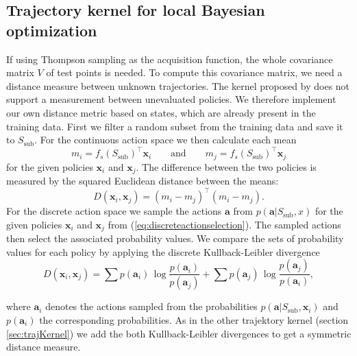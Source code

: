 \subsection{Trajectory kernel for local Bayesian optimization}
\label{sec:ownTK}
If using Thompson sampling as the acquisition function, the whole covariance matrix $V$ of test points is needed. To compute this covariance matrix, we need a distance measure between unknown trajectories. The kernel proposed by \cite{wilson2014using} does not support a measurement between unevaluated policies. We therefore implement our own distance metric based on states, which are already present in the training data. First we filter a random subset from the training data and save it to $S_{\text{sub}}$. For the continuous action space we then calculate each mean
$$m_i = f_s(S_{\text{sub}})^\top \mathbf{x}_i \qquad \text{and}\qquad m_j = f_s(S_{\text{sub}})^\top \mathbf{x}_j$$
for the given policies $\mathbf{x}_i$ and $\mathbf{x}_j$. The difference between the two policies is measured by the squared Euclidean distance between the means:
$$D(\mathbf{x}_i,\mathbf{x}_j) = (m_i - m_j)^\top (m_i - m_j).$$
For the discrete action space we sample the actions $\mathbf{a}$ from $p(\mathbf{a}|S_{\text{sub}},x)$ for the given policies $\mathbf{x}_i$ and $\mathbf{x}_j$ from (\ref{eq:discreteactionselection}). The sampled actions then select the associated probability values. We compare the sets of probability values for each policy by applying the discrete Kullback-Leibler divergence
$$D(\mathbf{x}_i,\mathbf{x}_j) = \sum p(\mathbf{a}_i)\,\log {\frac {p(\mathbf{a}_i)}{p(\mathbf{a}_j)}} + \sum p(\mathbf{a}_j)\,\log {\frac {p(\mathbf{a}_j)}{p(\mathbf{a}_i)}},$$

where $\mathbf{a}_i$ denotes the actions sampled from the probabilities $p(\mathbf{a}|S_{\text{sub}},\mathbf{x}_i)$ and $p(\mathbf{a}_i)$ the corresponding probabilities. As in the other trajektory kernel (section \ref{sec:trajKernel}) we add the both Kullback-Leibler divergences to get a symmetric distance measure.

%

